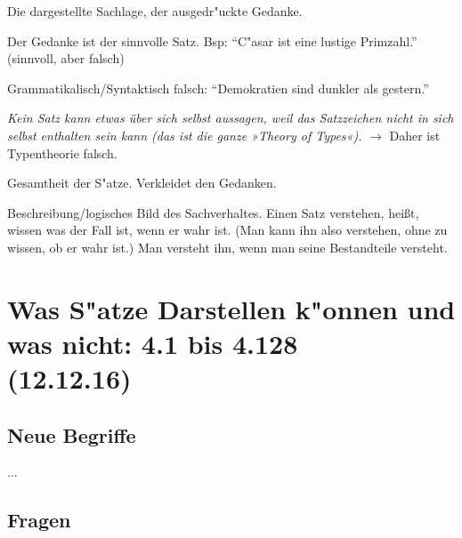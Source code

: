 \documentclass[emulatestandardclasses]{scrartcl}
\begin{document}
\begin{description}[leftmargin=!,labelwidth=\widthof{\bfseries Typentheorie}]
  \item[Sinn des Satzes] Die dargestellte Sachlage, der ausgedr"uckte Gedanke.
  \item[Sinnvoll] Der Gedanke ist der sinnvolle Satz. Bsp: "`C"asar ist eine lustige Primzahl."' (sinnvoll, aber falsch)
  \item[Unsinnig] Grammatikalisch/Syntaktisch falsch: "`Demokratien sind dunkler als gestern."'
  \item[Typentheorie] \emph{Kein Satz kann etwas über sich selbst aussagen, weil das Satzzeichen nicht in sich selbst enthalten sein kann (das ist die ganze »Theory of Types«).} $\rightarrow$ Daher ist Typentheorie falsch.
  \item[Sprache] Gesamtheit der S"atze. Verkleidet den Gedanken. 
  \item[Satz] Beschreibung/logisches Bild des Sachverhaltes. Einen Satz verstehen, heißt, wissen was der Fall ist, wenn er wahr ist. (Man kann ihn also verstehen, ohne zu wissen, ob er wahr ist.) Man versteht ihn, wenn man seine Bestandteile versteht.
\end{description}



\section{Was S"atze Darstellen k"onnen und was nicht: 4.1 bis 4.128\\(12.12.16)}

\vspace{10pt}
\subsection{Neue Begriffe}


\begin{description}[leftmargin=!,labelwidth=\widthof{\bfseries Sachverhalt}]
  \item[Bild] ...
  \item[Tatsache] 
\end{description}

\subsection{Fragen}
\end{document}
